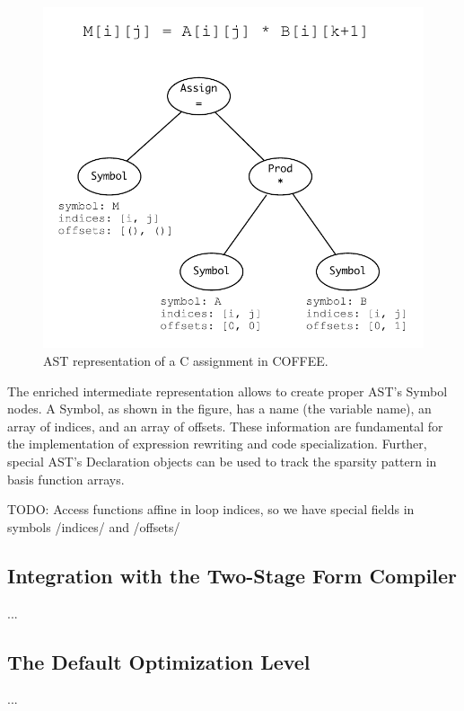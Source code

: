 \begin{figure}
\begin{center}
\includegraphics[scale=0.50]{coffee/pictures/coffee-ast.pdf}
\caption{AST representation of a C assignment in COFFEE.}
\label{fig:coffee-ast-vs-c}
\end{center}
\end{figure}

The enriched intermediate representation allows to create proper AST's Symbol nodes. A Symbol, as shown in the figure, has a name (the variable name), an array of indices, and an array of offsets. These information are fundamental for the implementation of expression rewriting and code specialization. Further, special AST's Declaration objects can be used to track the sparsity pattern in basis function arrays. 


TODO: Access functions affine in loop indices, so we have special fields in symbols /indices/ and /offsets/

\subsection{Integration with the Two-Stage Form Compiler}
...

\subsection{The Default Optimization Level}
...

